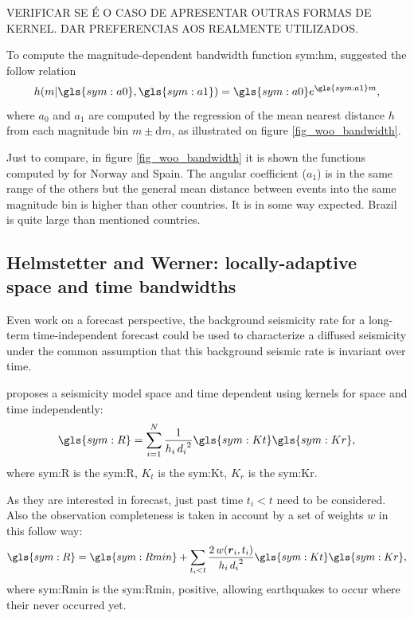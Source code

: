 \documentclass[draft, grl]{agutex}
\begin{document}
\begin{article}
VERIFICAR SE É O CASO DE APRESENTAR OUTRAS FORMAS DE KERNEL. DAR PREFERENCIAS AOS REALMENTE UTILIZADOS.


To compute the magnitude-dependent bandwidth function \gls{sym:hm}, \citet{woo_1996} suggested the follow relation
\begin{equation}
	\ensuremath{
		h(m\arrowvert \gls{sym:a0}, \gls{sym:a1}) = \gls{sym:a0}e^{\gls{sym:a1}m},
	}
	\label{eq:hm}
\end{equation}
where $a_0$ and $a_1$ are computed by the regression of the mean nearest distance $h$ from each magnitude bin $m \pm \mathrm{d}m$, as illustrated on figure \ref{fig_woo_bandwidth}.

Just to compare, in figure \ref{fig_woo_bandwidth} it is shown the functions computed by \citet{beauval_2003} for Norway and Spain. The angular coefficient ($a_1$) is in the same range of the others but the general mean distance between events into the same magnitude bin is higher than other countries. It is in some way expected. Brazil is quite large than mentioned countries.



\subsection{Helmstetter and Werner: locally-adaptive space and time bandwidths}


Even work on a forecast perspective, the background seismicity rate for a long-term time-independent forecast could be used to characterize a diffused seismicity under the common assumption that this background seismic rate is invariant over time.

\citet{helmstetter_2012} proposes a seismicity model space and time dependent using kernels for space and time independently:
\begin{equation}
	\ensuremath{\gls{sym:R} = \sum_{i=1}^{N}{ \frac{1}{h_i\,{d_i}^2} \gls{sym:Kt}\gls{sym:Kr} }},
	\label{eq:helms01}
\end{equation}
where \gls{sym:R} is the \glsdesc{sym:R},
	  $K_t$ is the \glsdesc{sym:Kt},
	  $K_r$ is the \glsdesc{sym:Kr}.


As they are interested in forecast, just past time $t_i < t$ need to be considered. Also the observation completeness is taken in account by a set of weights $w$ in this follow way:
\begin{equation}
\ensuremath{\gls{sym:R} = \gls{sym:Rmin} + \sum_{t_i < t}{
	\frac{2\,w(\boldsymbol{r}_i,t_i)}{h_i\,{d_i}^2}
			\gls{sym:Kt}\gls{sym:Kr} }},
	\label{eq:helms02}
\end{equation}
where \gls{sym:Rmin} is the \glsdesc{sym:Rmin}, positive, allowing earthquakes to occur where their never occurred yet.


\end{article}
\end{document}

